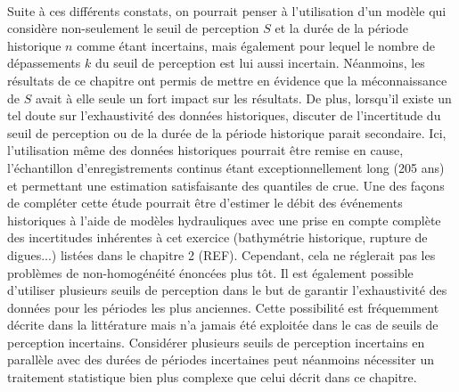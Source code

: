 	\paragraph{} Suite à ces différents constats, on pourrait penser à l'utilisation d'un modèle qui considère non-seulement le seuil de perception $S$ et la durée de la période historique $n$ comme étant incertains, mais également pour lequel le nombre de dépassements $k$ du seuil de perception est lui aussi incertain. Néanmoins, les résultats de ce chapitre ont permis de mettre en évidence que la méconnaissance de $S$ avait à elle seule un fort impact sur les résultats. De plus, lorsqu'il existe un tel doute sur l'exhaustivité des données historiques, discuter de l'incertitude du seuil de perception ou de la durée de la période historique parait secondaire. Ici, l'utilisation même des données historiques pourrait être remise en cause, l'échantillon d'enregistrements continus étant exceptionnellement long (205 ans) et permettant une estimation satisfaisante des quantiles de crue. Une des façons de compléter cette étude pourrait être d'estimer le débit des événements historiques à l'aide de modèles hydrauliques avec une prise en compte complète des incertitudes inhérentes à cet exercice (bathymétrie historique, rupture de digues...) listées dans le chapitre 2 (REF). Cependant, cela ne réglerait pas les problèmes de non-homogénéité énoncées plus tôt. Il est également possible d'utiliser plusieurs seuils de perception dans le but de garantir l'exhaustivité des données pour les périodes les plus anciennes. Cette possibilité est fréquemment décrite dans la littérature mais n'a jamais été exploitée dans le cas de seuils de perception incertains. Considérer plusieurs seuils de perception incertains en parallèle avec des durées de périodes incertaines peut néanmoins nécessiter un traitement statistique bien plus complexe que celui décrit dans ce chapitre.
	
